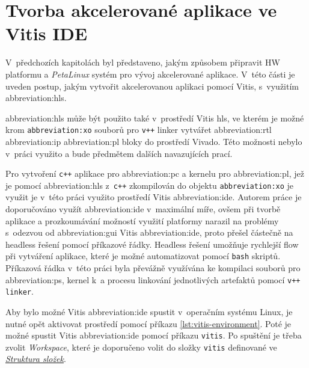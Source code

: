 \documentclass[a4paper, twoside, 11pt]{article}
\newcommand{\fbar}{\FloatBarrier}
\begin{document}
	\fbar
	\section{Tvorba akcelerované aplikace ve Vitis IDE}
	V~předchozích kapitolách byl představeno, jakým způsobem připravit HW platformu a \textit{PetaLinux} systém pro vývoj akcelerované aplikace. V~této části je uveden postup, jakým vytvořit akcelerovanou aplikaci pomocí Vitis, s~využitím \gls{abbreviation:hls}.\par
	\gls{abbreviation:hls} může být použito také v~prostředí Vitis hls, ve kterém je možné krom \texttt{\gls{abbreviation:xo}} souborů pro \texttt{v++} linker vytvářet \gls{abbreviation:rtl} \gls{abbreviation:ip} \gls{abbreviation:pl} bloky do prostředí Vivado. Této možnosti nebylo v~práci využito a bude předmětem dalších navazujících prací.\par
	Pro vytvoření \texttt{c++} aplikace pro \gls{abbreviation:pc} a kernelu pro \gls{abbreviation:pl}, jež je pomocí \gls{abbreviation:hls} z~\texttt{c++} zkompilován do objektu \texttt{\gls{abbreviation:xo}} je využit je v~této práci využito prostředí Vitis \gls{abbreviation:ide}. Autorem práce je doporučováno využít \gls{abbreviation:ide} v~maximální míře, ovšem při tvorbě aplikace a prozkoumávání možností využití platformy narazil na problémy s~odezvou od \gls{abbreviation:gui} Vitis \gls{abbreviation:ide}, proto přešel částečně na headless řešení pomocí příkazové řádky. Headless řešení umožňuje rychlejší flow při vytváření aplikace, které je možné automatizovat pomocí \texttt{bash} skriptů. Příkazová řádka v~této práci byla převážně využívána ke kompilaci souborů pro \gls{abbreviation:ps}, kernel k~a procesu linkování jednotlivých artefaktů pomocí \texttt{v++ linker}.\par
	Aby bylo možné Vitis \gls{abbreviation:ide} spustit v~operačním systému Linux, je nutné opět aktivovat prostředí pomocí příkazu \ref{lst:vitis-environment}. Poté je možné spustit Vitis \gls{abbreviation:ide} pomocí příkazu \texttt{vitis}. Po spuštění je třeba zvolit \textit{Workspace}, které je doporučeno volit do složky \texttt{vitis} definované ve \hyperref[sec:struktura-slozek]{\textit{Struktura složek}}.\par

		\fbar
\end{document}
